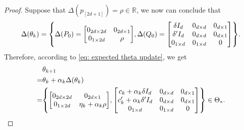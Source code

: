 \documentclass{article}
\newcommand{\R}{\mathbb{R}}
\begin{document}
\begin{proof}
Suppose that $\Delta(p_{[2d+1]}) = \rho \in \R$,
we now can conclude that
\begin{align}
    \Delta(\theta_k) 
    = \qty{
    \Delta(P_0)  = \mqty[0_{2d\times2d} & 0_{2d\times1}\\
                         0_{1\times2d} & \rho],
    \Delta(Q_0)  = \mqty[\delta I_d & 0_{d \times d} & 0_{d \times 1} \\
                         \delta' I_d & 0_{d \times d} & 0_{d \times 1} \\ 
                        0_{1 \times d} & 0_{1 \times d} & 0]}.
\end{align}
Therefore, according to \eqref{eq: expected theta update}, we get
\begin{align}
    &\theta_{k+1}\\ 
    =&\theta_k  + \alpha_k\Delta(\theta_k)\\
    =&\qty{
     \mqty[0_{2d\times2d} & 0_{2d\times1}\\
                         0_{1\times2d} & \eta_k + \alpha_k\rho],
     \mqty[c_k + \alpha_k\delta I_d & 0_{d \times d} & 0_{d \times 1} \\
           c_k' + \alpha_k\delta' I_d & 0_{d \times d} & 0_{d \times 1} \\ 
           0_{1 \times d} & 0_{1 \times d} & 0]
    }
    \in \Theta_*.
\end{align}

\end{proof}
\end{document}
